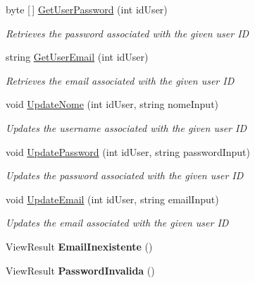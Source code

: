 \begin{DoxyCompactItemize}
byte \mbox{[}$\,$\mbox{]} \mbox{\hyperlink{classmvc_j_j_m_s_1_1_controllers_1_1_utilizador_controller_a71ba7901a09e013703d461927ab9ff80}{Get\+User\+Password}} (int id\+User)
\begin{DoxyCompactList}\small\item\em Retrieves the password associated with the given user ID \end{DoxyCompactList}\item 
string \mbox{\hyperlink{classmvc_j_j_m_s_1_1_controllers_1_1_utilizador_controller_a11bcddd35c8eeaaea9a7baf761b8f877}{Get\+User\+Email}} (int id\+User)
\begin{DoxyCompactList}\small\item\em Retrieves the email associated with the given user ID \end{DoxyCompactList}\item 
void \mbox{\hyperlink{classmvc_j_j_m_s_1_1_controllers_1_1_utilizador_controller_ae6ce52cd52288d470fb4d57da79dbffb}{Update\+Nome}} (int id\+User, string nome\+Input)
\begin{DoxyCompactList}\small\item\em Updates the username associated with the given user ID \end{DoxyCompactList}\item 
void \mbox{\hyperlink{classmvc_j_j_m_s_1_1_controllers_1_1_utilizador_controller_a9dec9a63e5d6e07567c884db33e69ef3}{Update\+Password}} (int id\+User, string password\+Input)
\begin{DoxyCompactList}\small\item\em Updates the password associated with the given user ID \end{DoxyCompactList}\item 
void \mbox{\hyperlink{classmvc_j_j_m_s_1_1_controllers_1_1_utilizador_controller_a11aabb148f5c11805d2fc9955a44a91d}{Update\+Email}} (int id\+User, string email\+Input)
\begin{DoxyCompactList}\small\item\em Updates the email associated with the given user ID \end{DoxyCompactList}\item 
\mbox{\label{classmvc_j_j_m_s_1_1_controllers_1_1_utilizador_controller_a2be8952c2ef886358ba107f962199a00}} 
View\+Result {\bfseries Email\+Inexistente} ()
\item 
\mbox{\label{classmvc_j_j_m_s_1_1_controllers_1_1_utilizador_controller_ac0481a2c0ce4068349866c229abaa9eb}} 
View\+Result {\bfseries Password\+Invalida} ()
\end{DoxyCompactItemize}
